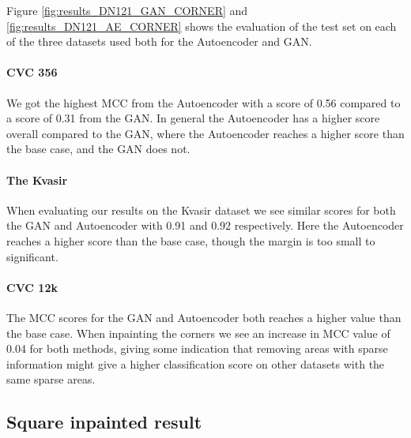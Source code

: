 %
Figure \ref{fig:results_DN121_GAN_CORNER} and \ref{fig:results_DN121_AE_CORNER} shows the evaluation of the test set on each of the three datasets used both for the Autoencoder and GAN. 

\paragraph{CVC 356}
We got the highest MCC from the Autoencoder with a score of 0.56 compared to a score of 0.31 from the GAN.
In general the Autoencoder has a higher score overall compared to the GAN, where the Autoencoder reaches a higher score than the base case, and the GAN does not.


\paragraph{The Kvasir}
When evaluating our results on the Kvasir dataset we see similar scores for both the GAN and Autoencoder with 0.91 and 0.92 respectively. Here the Autoencoder reaches a higher score than the base case, though the margin is too small to significant.

\paragraph{CVC 12k}
The MCC scores for the GAN and Autoencoder both reaches a higher value than the base case. When inpainting the corners we see an increase in MCC value of 0.04 for both methods, giving some indication that removing areas with sparse information might give a higher classification score on other datasets with the same sparse areas.




































\FloatBarrier
\subsection{Square inpainted result}


